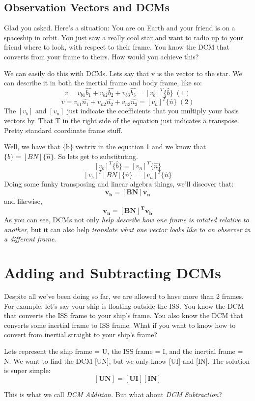 \documentclass[a4paper,14pt]{extreport}
\newcommand{\bv}[1]{\hat{b_{#1}}}
\newcommand{\nv}[1]{\hat{n_{#1}}}
\begin{document}
\subsection{Observation Vectors and DCMs}
Glad you asked. Here's a situation: You are on Earth and your friend is on a spaceship in orbit. You just saw a really cool star and want to radio up to your friend where to look, with respect to their frame. You know the DCM that converts from your frame to theirs. How would you achieve this?

We can easily do this with DCMs. Lets say that v is the vector to the star. We can describe it in both the inertial frame and body frame, like so:
\[v = v_{b1}\bv{1}+v_{b2}\bv{2}+v_{b3}\bv{3}=[v_b]^T\{\hat{b}\}\;(1)\]
\[v = v_{b1}\nv{1}+v_{n2}\nv{2}+v_{n3}\nv{3}=[v_n]^T\{\hat{n}\}\;(2)\]
The $[v_b]$ and $[v_n]$ just indicate the coefficients that you multiply your basis vectors by. That T in the right side of the equation just indicates a transpose. Pretty standard coordinate frame stuff. 

Well, we have that \{b\} vectrix in the equation 1 and we know that $\{\hat{b}\} = [BN]\{\hat{n}\}$. So lets get to substituting.
\[[v_b]^T\{\hat{b}\} = [v_n]^T\{\hat{n}\}\]
\[[v_b]^T[BN]\{\hat{n}\} = [v_n]^T\{\hat{n}\}\]
Doing some funky transposing and linear algebra things, we'll discover that:
\[\bm{v_b = [BN]v_n}\]
and likewise,
\[\bm{v_n = [BN]^Tv_b}\]
As you can see, DCMs not only \emph{help describe how one frame is rotated relative to another}, but it can also help \emph{translate what one vector looks like to an observer in a different frame}.
\section{Adding and Subtracting DCMs}
Despite all we've been doing so far, we are allowed to have more than 2 frames. For example, let's say your ship is floating outside the ISS. You know the DCM that converts the ISS frame to your ship's frame. You also know the DCM that converts some inertial frame to ISS frame. What if you want to know how to convert from inertial straight to your ship's frame? 

Lets represent the ship frame = U, the ISS frame = I, and the inertial frame = N. We want to find the DCM [UN], but we only know [UI] and [IN]. The solution is super simple:
\[\bm{[UN] = [UI][IN]}\]

This is what we call \emph{DCM Addition.} But what about \emph{DCM Subtraction}?
\end{document}
